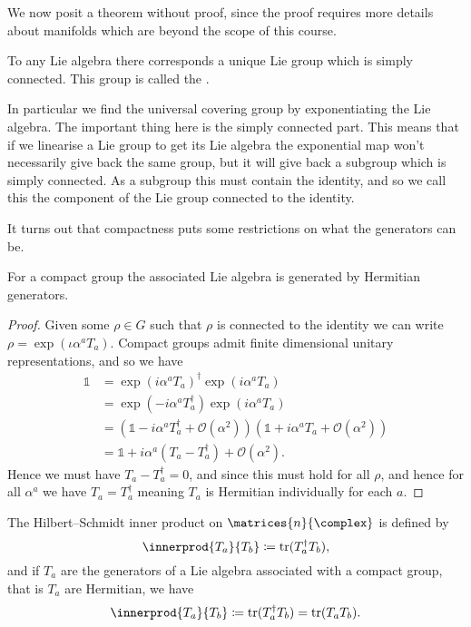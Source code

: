 \documentclass[fleqn]{NotesClass}
\newcommand*{\hermit}{\dagger}
\newcommand*{\ident}{\mathbb{1}}
\DeclareMathOperator{\tr}{tr}
\newcommand*{\order}{\mathcal{O}}
\begin{document}
    We now posit a theorem without proof, since the proof requires more details about manifolds which are beyond the scope of this course.
    \begin{thm}{}{}
        To any Lie algebra there corresponds a unique Lie group which is simply connected.
        This group is called the .
    \end{thm}
    In particular we find the universal covering group by exponentiating the Lie algebra.
    The important thing here is the simply connected part.
    This means that if we linearise a Lie group to get its Lie algebra the exponential map won't necessarily give back the same group, but it will give back a subgroup which is simply connected.
    As a subgroup this must contain the identity, and so we call this the component of the Lie group connected to the identity.
    
    It turns out that compactness puts some restrictions on what the generators can be.
    \begin{thm}{}{}
        For a compact group the associated Lie algebra is generated by Hermitian generators.
        \begin{proof}
            Given some \(\rho \in G\) such that \(\rho\) is connected to the identity we can write \(\rho = \exp(\iota\alpha^aT_a)\).
            Compact groups admit finite dimensional unitary representations, and so we have
            \begin{align}
                \ident &= \exp(i\alpha^aT_a)^\hermit \exp(i\alpha^aT_a)\\
                &= \exp(-i\alpha^aT_a^\hermit)\exp(i\alpha^aT_a)\\
                &= (\ident - i\alpha^aT_a^\hermit + \order(\alpha^2))(\ident + i\alpha^aT_a + \order(\alpha^2))\\
                &= \ident + i\alpha^a(T_a - T_a^\hermit) + \order(\alpha^2).
            \end{align}
            Hence we must have \(T_a - T_a^\hermit = 0\), and since this must hold for all \(\rho\), and hence for all \(\alpha^a\) we have \(T_a = T_a^\hermit\) meaning \(T_a\) is Hermitian individually for each \(a\).
        \end{proof}
    \end{thm}
    
    \begin{crl}{}{}
        The Hilbert--Schmidt inner product on \(\matrices{n}{\complex}\) is defined by
        \begin{equation}
            \innerprod{T_a}{T_b} \coloneqq \tr(T_a^\hermit T_b),
        \end{equation}
        and if \(T_a\) are the generators of a Lie algebra associated with a compact group, that is \(T_a\) are Hermitian, we have
        \begin{equation}
            \innerprod{T_a}{T_b} \coloneqq \tr(T_a^\hermit T_b) = \tr(T_aT_b).
        \end{equation}
    \end{crl}
    
\end{document}
